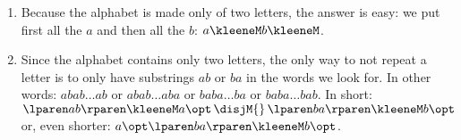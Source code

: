 \begin{enumerate}
  \item Because the alphabet is made only of two letters, the answer
    is easy: we put first all the \(a\) and then all the \(b\):
    \(a\kleeneM b\kleeneM\).

  \item Since the alphabet contains only two letters, the only way to
    not repeat a letter is to only have substrings \(ab\) or \(ba\) in
    the words we look for. In other words: \(abab\ldots ab\) or
    \(abab\ldots aba\) or \(baba\ldots ba\) or \(baba\ldots bab\). In
    short: \(\lparen ab \rparen\kleeneM a\opt \, \disjM{} \, \lparen
    ba \rparen\kleeneM b\opt\) or, even shorter: \(a\opt \lparen ba
    \rparen\kleeneM b\opt\).

\end{enumerate}


